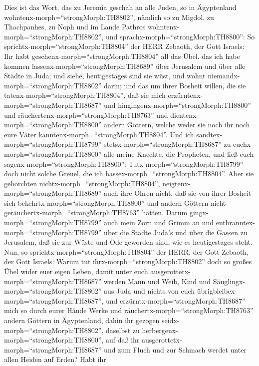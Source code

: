  Dies ist das Wort, das zu Jeremia geschah an alle Juden, so
in Ägyptenland wohntenx-morph=``strongMorph:TH8802'', nämlich so zu
Migdol, zu Thachpanhes, zu Noph und im Lande Pathros
wohntenx-morph=``strongMorph:TH8802'', und
sprachx-morph=``strongMorph:TH8800'':  So
sprichtx-morph=``strongMorph:TH8804'' der HERR Zebaoth, der Gott
Israels: Ihr habt gesehenx-morph=``strongMorph:TH8804'' all das Übel,
das ich habe kommen lassenx-morph=``strongMorph:TH8689'' über Jerusalem
und über alle Städte in Juda; und siehe, heutigestages sind sie wüst,
und wohnt niemandx-morph=``strongMorph:TH8802'' darin;  und
das um ihrer Bosheit willen, die sie
tatenx-morph=``strongMorph:TH8804'', daß sie mich
erzürntenx-morph=``strongMorph:TH8687'' und
hingingenx-morph=``strongMorph:TH8800'' und
räuchertenx-morph=``strongMorph:TH8763'' und
dientenx-morph=``strongMorph:TH8800'' andern Göttern, welche weder sie
noch ihr noch eure Väter kanntenx-morph=``strongMorph:TH8804''.
 Und ich sandtex-morph=``strongMorph:TH8799''
stetsx-morph=``strongMorph:TH8687'' zu
euchx-morph=``strongMorph:TH8800'' alle meine Knechte, die Propheten,
und ließ euch sagenx-morph=``strongMorph:TH8800'':
Tutx-morph=``strongMorph:TH8799'' doch nicht solche Greuel, die ich
hassex-morph=``strongMorph:TH8804''.  Aber sie gehorchten
nichtx-morph=``strongMorph:TH8804'',
neigtenx-morph=``strongMorph:TH8689'' auch ihre Ohren nicht, daß sie von
ihrer Bosheit sich bekehrtx-morph=``strongMorph:TH8800'' und andern
Göttern nicht geräuchertx-morph=``strongMorph:TH8763'' hätten.
 Darum gingx-morph=``strongMorph:TH8799'' auch mein Zorn und
Grimm an und entbranntex-morph=``strongMorph:TH8799'' über die Städte
Juda's und über die Gassen zu Jerusalem, daß sie zur Wüste und Öde
geworden sind, wie es heutigestages steht.  Nun, so
sprichtx-morph=``strongMorph:TH8804'' der HERR, der Gott Zebaoth, der
Gott Israels: Warum tut ihrx-morph=``strongMorph:TH8802'' doch so großes
Übel wider euer eigen Leben, damit unter euch
ausgerottetx-morph=``strongMorph:TH8687'' werden Mann und Weib, Kind und
Säuglingx-morph=``strongMorph:TH8802'' aus Juda und nichts von euch
übrigbleibex-morph=``strongMorph:TH8687'',  und
erzürntx-morph=``strongMorph:TH8687'' mich so durch eurer Hände Werke
und räuchertx-morph=``strongMorph:TH8763'' andern Göttern in
Ägyptenland, dahin ihr gezogen seidx-morph=``strongMorph:TH8802'',
daselbst zu herbergenx-morph=``strongMorph:TH8800'', auf daß ihr
ausgerottetx-morph=``strongMorph:TH8687'' und zum Fluch und zur Schmach
werdet unter allen Heiden auf Erden?  Habt ihr
